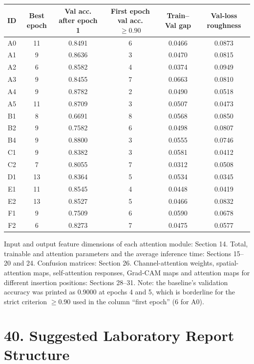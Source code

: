 \documentclass[10pt]{article}
\begin{document}
\begin{center}
\small
\begin{tabular}{|c|c|c|c|c|c|}
\hline
\textbf{ID} & \textbf{Best epoch} & \textbf{Val acc. after epoch 1} & \textbf{First epoch val acc. $\ge0.90$} & \textbf{Train--Val gap} & \textbf{Val-loss roughness} \\
\hline
A0 & 11 & 0.8491 & 6 & 0.0466 & 0.0873 \\
\hline
A1 & 9 & 0.8636 & 3 & 0.0470 & 0.0815 \\
\hline
A2 & 6 & 0.8582 & 4 & 0.0374 & 0.0949 \\
\hline
A3 & 9 & 0.8455 & 7 & 0.0663 & 0.0810 \\
\hline
A4 & 9 & 0.8782 & 2 & 0.0490 & 0.0518 \\
\hline
A5 & 11 & 0.8709 & 3 & 0.0507 & 0.0473 \\
\hline
B1 & 8 & 0.6691 & 8 & 0.0568 & 0.0850 \\
\hline
B2 & 9 & 0.7582 & 6 & 0.0498 & 0.0807 \\
\hline
B4 & 9 & 0.8800 & 3 & 0.0555 & 0.0746 \\
\hline
C1 & 9 & 0.8382 & 3 & 0.0581 & 0.0412 \\
\hline
C2 & 7 & 0.8055 & 7 & 0.0312 & 0.0508 \\
\hline
D1 & 13 & 0.8364 & 5 & 0.0534 & 0.0345 \\
\hline
E1 & 11 & 0.8545 & 4 & 0.0448 & 0.0419 \\
\hline
E2 & 13 & 0.8527 & 5 & 0.0466 & 0.0832 \\
\hline
F1 & 9 & 0.7509 & 6 & 0.0590 & 0.0678 \\
\hline
F2 & 6 & 0.8273 & 7 & 0.0475 & 0.0577 \\
\hline
\end{tabular}
\end{center}

Input and output feature dimensions of each attention module: Section 14. Total, trainable and attention parameters and the average inference time: Sections 15--20 and 24. Confusion matrices: Section 26. Channel-attention weights, spatial-attention maps, self-attention responses, Grad-CAM maps and attention maps for different insertion positions: Sections 28--31.
Note: the baseline's validation accuracy was printed as 0.9000 at epochs 4 and 5, which is borderline for the strict criterion $\ge0.90$ used in the column ``first epoch'' (6 for A0).

\section*{40. Suggested Laboratory Report Structure}
\end{document}
